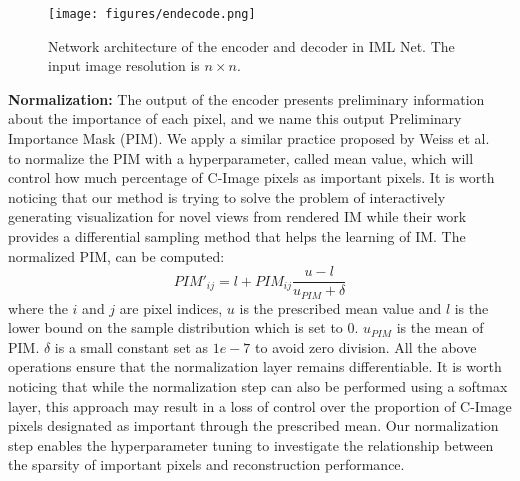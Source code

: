 \begin{figure}[t]
    \centering 
    \texttt{[image: figures/endecode.png]}
    \caption{Network architecture of the encoder and decoder in IML Net. The input image resolution is $n\times n$.}
    \label{fig:endecoder}
\end{figure}

\textbf{Normalization:} The output of the encoder presents preliminary information about the importance of each pixel, and we name this output Preliminary Importance Mask (PIM). We apply a similar practice proposed by Weiss et al.~\cite{9264699} to normalize the PIM with a hyperparameter, called mean value, which will control how much percentage of C-Image pixels as important pixels. It is worth noticing that our method is trying to solve the problem of interactively generating visualization for novel views from rendered IM while their work~\cite{9264699} provides a differential sampling method that helps the learning of IM. The normalized PIM, can be computed:
\begin{equation}
PIM'_{ij} = l+PIM_{ij}\frac{u - l}{u_{PIM}+\delta}
\end{equation}
where the $i$ and $j$ are pixel indices, $u$ is the prescribed mean value and $l$ is the lower bound on the sample distribution which is set to 0. $u_{PIM}$ is the mean of PIM. $\delta$ is a small constant set as $1e-7$ to avoid zero division. All the above operations ensure that the normalization layer remains differentiable. It is worth noticing that while the normalization step can also be performed using a softmax layer, this approach may result in a loss of control over the proportion of C-Image pixels designated as important through the prescribed mean. Our normalization step enables the hyperparameter tuning to investigate the relationship between the sparsity of important pixels and reconstruction performance.


